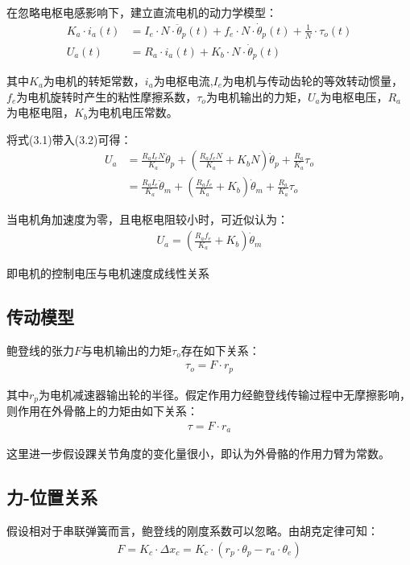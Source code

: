 在忽略电枢电感影响下，建立直流电机的动力学模型：
\begin{align}
K_{a} \cdot i_{a}(t)&=I_{e} \cdot N \cdot \ddot{\theta}_{p}(t)+f_{e} \cdot N \cdot \dot{\theta}_{p}(t)+\frac{1}{N} \cdot \tau_{o}(t) \\ 
U_{a}(t)&=R_{a} \cdot i_{a}(t)+K_{b} \cdot N \cdot \dot{\theta}_{p}(t)
\end{align}

其中$K_a$为电机的转矩常数，$i_a$为电枢电流,$I_e$为电机与传动齿轮的等效转动惯量，$f_e$为电机旋转时产生的粘性摩擦系数，$\tau_o$为电机输出的力矩，$U_a$为电枢电压，$R_a$为电枢电阻，$K_b$为电机电压常数。

将式(3.1)带入(3.2)可得：
\begin{align} U_{a} &=\frac{R_{a} I_{e} N}{K_{a}} \ddot{\theta}_{p}+\left(\frac{R_{a} f_{e} N}{K_{a}}+K_{b} N\right) \dot{\theta}_{p}+\frac{R_{a}}{K_{a}} \tau_{o} \\ &=\frac{R_{a} I_{e}}{K_{a}} \ddot{\theta}_{m}+\left(\frac{R_{a} f_{e}}{K_{a}}+K_{b}\right) \dot{\theta}_{m}+\frac{R_{a}}{K_{a}} \tau_{o} 
\end{align}

当电机角加速度为零，且电枢电阻较小时，可近似认为：
\begin{align}
U_{a}=\left(\frac{R_{a} f_{e}}{K_{a}}+K_{b}\right) \dot{\theta}_{m}
\end{align}

即电机的控制电压与电机速度成线性关系

\subsection{传动模型}

鲍登线的张力$F$与电机输出的力矩$\tau_o$存在如下关系：
\begin{align}
    \tau_o = F\cdot r_p
\end{align}

其中$r_p$为电机减速器输出轮的半径。假定作用力经鲍登线传输过程中无摩擦影响，则作用在外骨骼上的力矩由如下关系：
\begin{align}
    \tau = F\cdot r_a
\end{align}

这里进一步假设踝关节角度的变化量很小，即认为外骨骼的作用力臂为常数。

\subsection{力-位置关系}

假设相对于串联弹簧而言，鲍登线的刚度系数可以忽略。由胡克定律可知：
\begin{align}
    F = K_c \cdot \Delta x_c = K_c \cdot (r_p\cdot \theta_p - r_a\cdot \theta_e)
\end{align}

